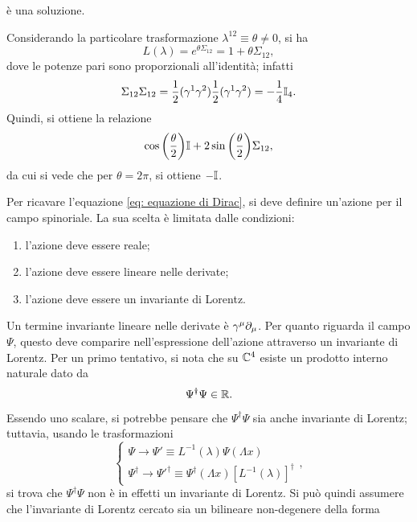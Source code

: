 è una soluzione. 
\begin{ex}
    Considerando la particolare trasformazione $\lambda^{12} \equiv \theta \neq 0$, si ha 
    \begin{equation}
        L(\lambda) = e^{\theta\Sigma_{12}} = 1 + \theta\Sigma_{12},
    \end{equation}
    dove le potenze pari sono proporzionali all'identità; infatti
    \begin{equation}
        \Sigma_{12}\Sigma_{12} = \frac{1}{2}(\gamma^1\gamma^2)\frac{1}{2}(\gamma^1\gamma^2) = -\frac{1}{4}\mathbb{I}_4.
    \end{equation}
    Quindi, si ottiene la relazione
    \begin{equation}
        \cos{\bigg(\frac{\theta}{2}\bigg)}\mathbb{I} + 2\sin{\bigg(\frac{\theta}{2}\bigg)}\Sigma_{12},
    \end{equation}
    da cui si vede che per $\theta = 2\pi$, si ottiene $-\mathbb{I}$. 
\end{ex}
Per ricavare l'equazione \eqref{eq: equazione di Dirac}, si deve definire un'azione per il campo spinoriale. La sua scelta è limitata dalle condizioni:
\begin{enumerate}
    \item l'azione deve essere reale;
    \item l'azione deve essere lineare nelle derivate;
    \item l'azione deve essere un invariante di Lorentz.
\end{enumerate}
Un termine invariante lineare nelle derivate è $\gamma^\mu\partial_\mu$. Per quanto riguarda il campo $\Psi$, questo deve comparire nell'espressione dell'azione attraverso un invariante di Lorentz. Per un primo tentativo, si nota che su $\mathbb{C}^4$ esiste un prodotto interno naturale dato da
\begin{equation}
    \Psi^\dag\Psi \in \mathbb{R}.
\end{equation}
Essendo uno scalare, si potrebbe pensare che $\Psi^\dag\Psi$ sia anche invariante di Lorentz; tuttavia, usando le trasformazioni
\begin{equation}
    \begin{cases}
        \Psi \to \Psi' \equiv L^{-1}(\lambda)\Psi(\Lambda x) \\
        \Psi^\dag \to \Psi'^\dag \equiv \Psi^\dag(\Lambda x)[L^{-1}(\lambda)]^\dag
    \end{cases},
\end{equation}
si trova che $\Psi^\dag\Psi$ non è in effetti un invariante di Lorentz. Si può quindi assumere che l'invariante di Lorentz cercato sia un bilineare non-degenere della forma 
